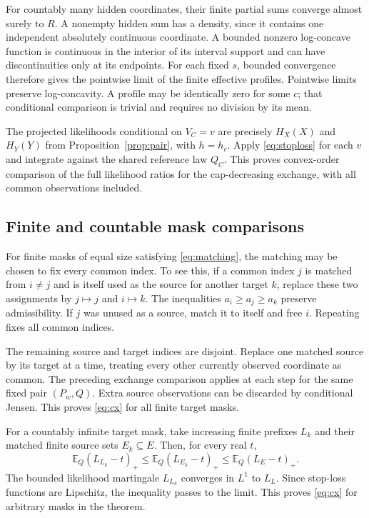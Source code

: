\documentclass[11pt,a4paper]{article}
\theoremstyle{remark}\newtheorem*{ednote}{Editorial note (ProveIt, 2026-10-01)}
\newcommand{\E}{\mathbb E}\newcommand{\R}{\mathbb R}\newcommand{\N}{\mathbb N}
\begin{document}
For countably many hidden coordinates, their finite partial sums converge almost surely to $R$. A nonempty hidden sum has a density, since it contains one independent absolutely continuous coordinate. A bounded nonzero log-concave function is continuous in the interior of its interval support and can have discontinuities only at its endpoints. For each fixed $s$, bounded convergence therefore gives the pointwise limit of the finite effective profiles. Pointwise limits preserve log-concavity. A profile may be identically zero for some $c$; that conditional comparison is trivial and requires no division by its mean.

The projected likelihoods conditional on $V_C=v$ are precisely $H_X(X)$ and $H_Y(Y)$ from Proposition~\ref{prop:pair}, with $h=h_c$. Apply \eqref{eq:stoploss} for each $v$ and integrate against the shared reference law $Q_C$. This proves convex-order comparison of the full likelihood ratios for the cap-decreasing exchange, with all common observations included.

\subsection{Finite and countable mask comparisons}
For finite masks of equal size satisfying \eqref{eq:matching}, the matching may be chosen to fix every common index. To see this, if a common index $j$ is matched from $i\ne j$ and is itself used as the source for another target $k$, replace these two assignments by $j\mapsto j$ and $i\mapsto k$. The inequalities $a_i\ge a_j\ge a_k$ preserve admissibility. If $j$ was unused as a source, match it to itself and free $i$. Repeating fixes all common indices.

The remaining source and target indices are disjoint. Replace one matched source by its target at a time, treating every other currently observed coordinate as common. The preceding exchange comparison applies at each step for the same fixed pair $(P_w,Q)$. Extra source observations can be discarded by conditional Jensen. This proves \eqref{eq:cx} for all finite target masks.

For a countably infinite target mask, take increasing finite prefixes $L_k$ and their matched finite source sets $E_k\subseteq E$. Then, for every real $t$,
\[
 \E_Q(L_{L_k}-t)_+
 \le\E_Q(L_{E_k}-t)_+
 \le\E_Q(L_E-t)_+.
\]
The bounded likelihood martingale $L_{L_k}$ converges in $L^1$ to $L_L$. Since stop-loss functions are Lipschitz, the inequality passes to the limit. This proves \eqref{eq:cx} for arbitrary masks in the theorem.
\end{document}
